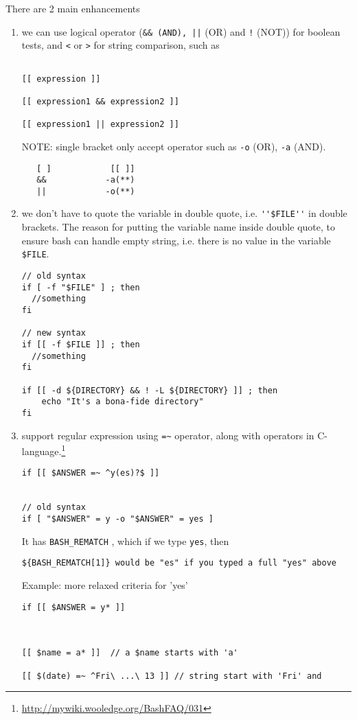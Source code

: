 There are 2 main enhancements
\begin{enumerate}
  
  \item we can use logical operator (\verb!&& (AND), ||! (OR) and \verb.!.
  (NOT)) for boolean tests, and \verb!<! or \verb!>! for string comparison, such as 
\begin{verbatim}

[[ expression ]]

[[ expression1 && expression2 ]]

[[ expression1 || expression2 ]]

\end{verbatim}

NOTE: single bracket only accept operator such as \verb!-o! (OR), 
\verb!-a! (AND).
\begin{verbatim}
   [ ]            [[ ]]
   &&            -a(**)
   ||            -o(**)
\end{verbatim}

  \item  we don't have to quote the variable in double quote, i.e.
  \verb!''$FILE''! in double brackets.
The reason for putting the variable name inside double quote, to ensure bash can
handle empty string, i.e. there is no value in the variable \verb!$FILE!.
\begin{verbatim}
// old syntax
if [ -f "$FILE" ] ; then
  //something
fi

// new syntax
if [[ -f $FILE ]] ; then
  //something
fi

if [[ -d ${DIRECTORY} && ! -L ${DIRECTORY} ]] ; then
    echo "It's a bona-fide directory"
fi

\end{verbatim}

  \item support regular expression using \verb!=~! operator, along with operators in
C-language.\footnote{\url{http://mywiki.wooledge.org/BashFAQ/031}} 
  
\begin{verbatim}
if [[ $ANSWER =~ ^y(es)?$ ]]


// old syntax
if [ "$ANSWER" = y -o "$ANSWER" = yes ]

\end{verbatim}

It has \verb!BASH_REMATCH! , which if we type \verb!yes!, then
\begin{verbatim}
${BASH_REMATCH[1]} would be "es" if you typed a full "yes" above
\end{verbatim}

Example: more relaxed criteria for 'yes'
\begin{verbatim}
if [[ $ANSWER = y* ]]



[[ $name = a* ]]  // a $name starts with 'a'

[[ $(date) =~ ^Fri\ ...\ 13 ]] // string start with 'Fri' and 
\end{verbatim}

\end{enumerate}


